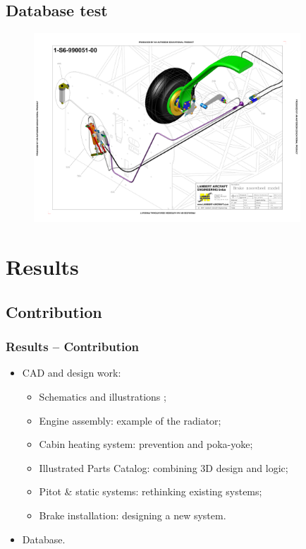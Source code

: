 \documentclass{beamer}
\begin{document}
\subsection{Database test}
\begin{frame}
\begin{figure}[ht!]
	\begin{center}
		\includegraphics[width=10cm,trim = 1.5cm 2.5cm 1.5cm 2.5cm, clip]{pics/PIC019.pdf}
		\label{fig:PIC019}
	\end{center}
\end{figure}
\end{frame}

\section{Results}
\subsection{Contribution}

\begin{frame}\frametitle{Results -- Contribution}
\begin{itemize}
\item CAD and design work:
\begin{itemize}
\item Schematics and illustrations ;
\item Engine assembly: example of the radiator;
\item Cabin heating system: prevention and poka-yoke;
\item Illustrated Parts Catalog: combining 3D design and logic;
\item Pitot \& static systems: rethinking existing systems;
\item Brake installation: designing a new system.
\end{itemize}
\item Database.
\end{itemize}
\end{frame}
\end{document}
